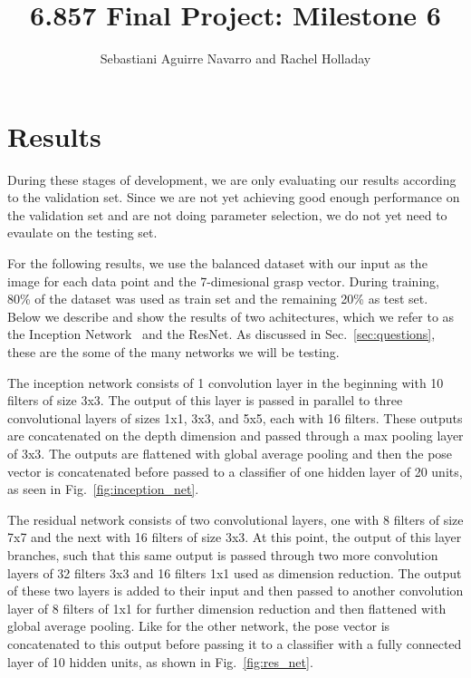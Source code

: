 \documentclass[letterpaper, 10 pt, conference]{../ieeeconf}
\newcommand{\sref}[1]{Sec.~\ref{#1}} %
\newcommand{\figref}[1]{Fig.~\ref{#1}} %
\begin{document}
\title{6.857 Final Project: Milestone 6}
\author{Sebastiani Aguirre Navarro and Rachel Holladay}
\maketitle





\section{Results}
\label{sec:results}

During these stages of development, we are only evaluating our results according to the validation set. 
Since we are not yet achieving good enough performance on the validation set and are not doing parameter selection, we do not yet need to evaulate on the testing set. 

For the following results, we use the balanced dataset with our input as the image for each data point and the 7-dimesional grasp vector. 
During training, 80\% of the dataset was used as train set and the remaining 20\% as test set. 
Below we describe and show the results of two achitectures, which we refer to as the Inception Network~\cite{szegedy2015going} and the ResNet.
As discussed in \sref{sec:questions}, these are the some of the many networks we will be testing.  

The inception network consists of 1 convolution layer in the beginning with 10 filters of size 3x3. 
The output of this layer is passed in parallel to three convolutional layers of sizes 1x1, 3x3, and 5x5, each with 16 filters. 
These outputs are concatenated on the depth dimension and passed through a max pooling layer of 3x3. 
The outputs are flattened with global average pooling and then the pose vector is concatenated before passed to a classifier of one hidden layer of 20 units, as seen in \figref{fig:inception_net}. 

The residual network consists of two convolutional layers, one with 8 filters of size 7x7 and the next with 16 filters of size 3x3.
At this point, the output of this layer branches, such that this same output is passed through two more convolution layers of 32 filters 3x3 and 16 filters 1x1 used as dimension reduction. 
The output of these two layers is added to their input and then passed to another convolution layer of 8 filters of 1x1 for further dimension reduction and then flattened with global average pooling. 
Like for the other network, the pose vector is concatenated to this output before passing it to a classifier with a fully connected layer of 10 hidden units, as shown in \figref{fig:res_net}.
 
\end{document}
